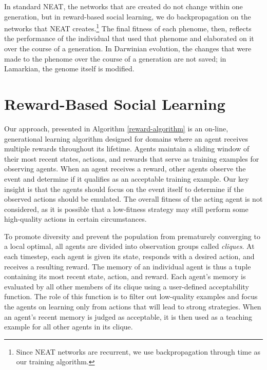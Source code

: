 \documentclass{acm_proc_article-sp}
\begin{document}
In standard NEAT, the networks that are created do not change within one generation, but in reward-based social learning, we do backpropagation \cite{rumelhart1986learning} on the networks that NEAT creates.\footnote{Since NEAT networks are recurrent, we use backpropagation through time \cite{werbos1990backpropagation} as our training algorithm.} The final fitness of each phenome, then, reflects the performance of the individual that used that phenome and elaborated on it over the course of a generation. In Darwinian evolution, the changes that were made to the phenome over the course of a generation are not saved; in Lamarkian, the genome itself is modified.

\section{Reward-Based Social Learning}
\label{sec:rbsl}

Our approach, presented in Algorithm \ref{reward-algorithm} is an on-line, generational learning algorithm designed for domains where an agent receives multiple rewards throughout its lifetime. Agents maintain a sliding window of their most recent states, actions, and rewards that serve as training examples for observing agents. When an agent receives a reward, other agents observe the event and determine if it qualifies as an acceptable training example. Our key insight is that the agents should focus on the event itself to determine if the observed actions should be emulated. The overall fitness of the acting agent is not considered, as it is possible that a low-fitness strategy may still perform some high-quality actions in certain circumstances.

To promote diversity and prevent the population from prematurely converging to a local optimal, all agents are divided into observation groups called \textit{cliques}. At each timestep, each agent is given its state, responds with a desired action, and receives a resulting reward. The memory of an individual agent is thus a tuple containing its most recent state, action, and reward. Each agent's memory is evaluated by all other members of its clique using a user-defined acceptability function. The role of this function is to filter out low-quality examples and focus the agents on learning only from actions that will lead to strong strategies. When an agent's recent memory is judged as acceptable, it is then used as a teaching example for all other agents in its clique.
\end{document}
